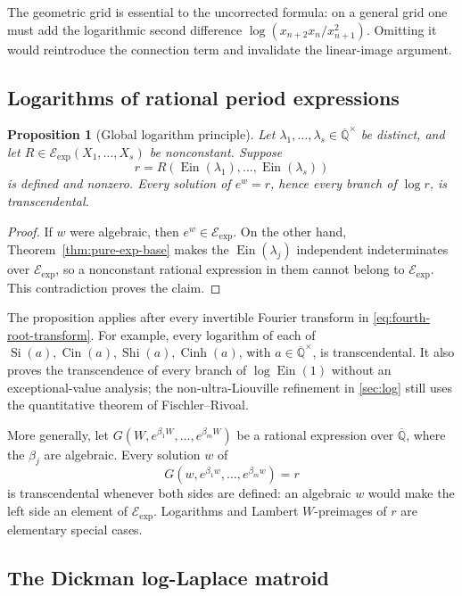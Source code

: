 \documentclass[11pt]{article}
\newtheorem{proposition}[theorem]{Proposition}
\theoremstyle{definition}
\theoremstyle{remark}
\newcommand{\Qbar}{\overline{\mathbb Q}}
\newcommand{\Ein}{\operatorname{Ein}}
\newcommand{\Cin}{\operatorname{Cin}}
\newcommand{\Eexp}{\mathcal E_{\mathrm{exp}}}
\newcommand{\Si}{\operatorname{Si}}
\newcommand{\Shi}{\operatorname{Shi}}
\newcommand{\Cinh}{\operatorname{Cinh}}
\begin{document}
The geometric grid is essential to the uncorrected formula: on a general
grid one must add the logarithmic second difference
\(\log(x_{n+2}x_n/x_{n+1}^2)\).  Omitting it would reintroduce the connection
term and invalidate the linear-image argument.

\subsection{Logarithms of rational period expressions}

\begin{proposition}[Global logarithm principle]
\label{prop:global-log-principle}
Let \(\lambda_1,\ldots,\lambda_s\in\Qbar^\times\) be distinct, and let
\(R\in\Eexp(X_1,\ldots,X_s)\) be nonconstant.  Suppose
\[
 r=R(\Ein(\lambda_1),\ldots,\Ein(\lambda_s))
\]
is defined and nonzero.  Every solution of \(e^w=r\), hence every branch of
\(\log r\), is transcendental.
\end{proposition}

\begin{proof}
If \(w\) were algebraic, then \(e^w\in\Eexp\).  On the other hand,
Theorem~\ref{thm:pure-exp-base} makes the \(\Ein(\lambda_j)\) independent
indeterminates over \(\Eexp\), so a nonconstant rational expression in
them cannot belong to \(\Eexp\).  This contradiction proves the claim.
\end{proof}

The proposition applies after every invertible Fourier transform in
\eqref{eq:fourth-root-transform}.  For example, every logarithm of each of
\(\Si(a),\Cin(a),\Shi(a),\Cinh(a)\), with
\(a\in\Qbar^\times\), is transcendental.  It also proves the transcendence
of every branch of \(\log\Ein(1)\) without an exceptional-value analysis;
the non-ultra-Liouville refinement in \cref{sec:log} still uses the
quantitative theorem of Fischler--Rivoal.

More generally, let
\(G(W,e^{\beta_1W},\ldots,e^{\beta_mW})\) be a rational expression over
\(\Qbar\), where the \(\beta_j\) are algebraic.  Every solution \(w\) of
\[
 G(w,e^{\beta_1w},\ldots,e^{\beta_mw})=r
\]
is transcendental whenever both sides are defined: an algebraic \(w\)
would make the left side an element of \(\Eexp\).  Logarithms and Lambert
\(W\)-preimages of \(r\) are elementary special cases.

\subsection{The Dickman log-Laplace matroid}
\end{document}
